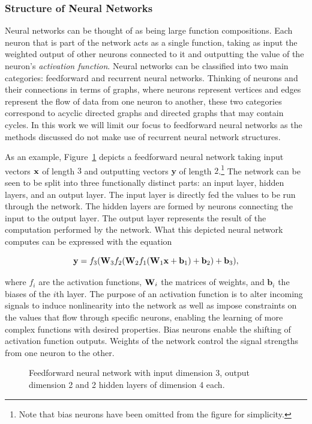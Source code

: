 \subsubsection{Structure of Neural Networks}

Neural networks can be thought of as being large function compositions. Each neuron that is part of the network acts as a single function, taking as input the weighted output of other neurons connected to it and outputting the value of the neuron's \textit{activation function}. Neural networks can be classified into two main categories: feedforward and recurrent neural networks. Thinking of neurons and their connections in terms of graphs, where neurons represent vertices and edges represent the flow of data from one neuron to another, these two categories correspond to acyclic directed graphs and directed graphs that may contain cycles. In this work we will limit our focus to feedforward neural networks as the methods discussed do not make use of recurrent neural network structures.

As an example, Figure~\ref{fig:nn} depicts a feedforward neural network taking input vectors $\mathbf{x}$ of length $3$ and outputting vectors $\mathbf{y}$ of length $2$.\footnote{Note that bias neurons have been omitted from the figure for simplicity.} The network can be seen to be split into three functionally distinct parts: an input layer, hidden layers, and an output layer. The input layer is directly fed the values to be run through the network. The hidden layers are formed by neurons connecting the input to the output layer. The output layer represents the result of the computation performed by the network. What this depicted neural network computes can be expressed with the equation

$$\mathbf{y} = f_3(\mathbf{W}_3 f_2(\mathbf{W}_2 f_1(\mathbf{W}_1 \mathbf{x} + \mathbf{b}_1) + \mathbf{b}_2) + \mathbf{b}_3),$$

where $f_i$ are the activation functions, $\mathbf{W}_i$ the matrices of weights, and $\mathbf{b}_i$ the biases of the $i$th layer. The purpose of an activation function is to alter incoming signals to induce nonlinearity into the network as well as impose constraints on the values that flow through specific neurons, enabling the learning of more complex functions with desired properties. Bias neurons enable the shifting of activation function outputs. Weights of the network control the signal strengths from one neuron to the other.

\begin{figure}[!htb]
  \centering
  \resizebox{0.7\textwidth}{!}{\unskip}
  \caption{Feedforward neural network with input dimension 3, output dimension 2 and 2 hidden layers of dimension 4 each.}
  \label{fig:nn}
\end{figure}

